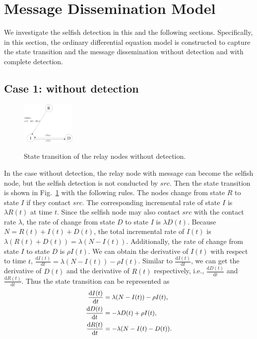 \section{Message Dissemination Model}
\label{sec:ode_model}
We investigate the selfish detection in this and the following sections.
Specifically, in this section, the ordinary differential equation model
is constructed to capture the state transition and the message dissemination
without detection and with complete detection.
\subsection{Case 1: without detection}
\label{subsec:wo_detc}
\begin{figure}
  \centering
  {\includegraphics[width=0.23\textwidth]
  {fig/state_transition_no_detect.eps}}
     \caption{State transition of the relay nodes without detection.}
     \label{fig:ss_wo_dt}
\end{figure}
In the case without detection,
the relay node with message can become the selfish node,
but the selfish detection is not conducted by $src$.
Then the state transition is shown
in Fig.~\ref{fig:ss_wo_dt} with the following rules.
The nodes change from state $R$ to state $I$ if they contact $src$.
The corresponding incremental rate
of state $I$ is $\lambda R(t)$ at time $t$.
Since the selfish node may also contact
$src$ with the contact rate $\lambda$,
the rate of change from state $D$
to state $I$ is $\lambda D(t)$.
Because $N=R(t)+I(t)+D(t)$,
the total incremental rate of $I(t)$ is
$\lambda \left( R(t)+D(t) \right) = \lambda \left( N-I(t) \right)$.
Additionally, the rate of change
from state $I$ to state $D$ is $\rho I(t)$.
We can obtain the derivative of $I(t)$ with respect to time $t$,
$\frac{\mathrm{d} I(t)}{\mathrm{d} t} = \lambda (N-I(t)) - \rho I(t)$.
Similar to $\frac{\mathrm{d} I(t)}{\mathrm{d} t}$,
we can get the derivative of $D(t)$
and the derivative of $R(t)$ respectively,
i.e., $\frac{\mathrm{d} D(t)}{\mathrm{d} t}$ and
$\frac{\mathrm{d} R(t)}{\mathrm{d} t}$.
Thus the state transition can be represented as
\begin{equation}
\begin{small}
\label{eq:IDR_wo}
\begin{aligned}
\frac{\mathrm{d} I(t)}{\mathrm{d} t} &=
\lambda (N-I(t)) - \rho I(t),\\
\frac{\mathrm{d} D(t)}{\mathrm{d} t} &= - \lambda D(t) + \rho I(t),\\
\frac{\mathrm{d} R(t)}{\mathrm{d} t} &= - \lambda (N-I(t)-D(t)).
\end{aligned}
\end{small}
\end{equation}
